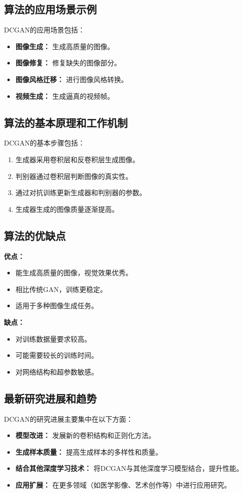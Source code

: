 \subsection*{算法的应用场景示例}
DCGAN的应用场景包括：
\begin{itemize}
    \item \textbf{图像生成：} 生成高质量的图像。
    \item \textbf{图像修复：} 修复缺失的图像部分。
    \item \textbf{图像风格迁移：} 进行图像风格转换。
    \item \textbf{视频生成：} 生成逼真的视频帧。
\end{itemize}

\subsection*{算法的基本原理和工作机制}
DCGAN的基本步骤包括：
\begin{enumerate}
    \item 生成器采用卷积层和反卷积层生成图像。
    \item 判别器通过卷积层判断图像的真实性。
    \item 通过对抗训练更新生成器和判别器的参数。
    \item 生成器生成的图像质量逐渐提高。
\end{enumerate}

\subsection*{算法的优缺点}
\textbf{优点：}
\begin{itemize}
    \item 能生成高质量的图像，视觉效果优秀。
    \item 相比传统GAN，训练更稳定。
    \item 适用于多种图像生成任务。
\end{itemize}

\textbf{缺点：}
\begin{itemize}
    \item 对训练数据量要求较高。
    \item 可能需要较长的训练时间。
    \item 对网络结构和超参数敏感。
\end{itemize}

\subsection*{最新研究进展和趋势}
DCGAN的研究进展主要集中在以下方面：
\begin{itemize}
    \item \textbf{模型改进：} 发展新的卷积结构和正则化方法。
    \item \textbf{生成样本质量：} 提高生成样本的多样性和质量。
    \item \textbf{结合其他深度学习技术：} 将DCGAN与其他深度学习模型结合，提升性能。
    \item \textbf{应用扩展：} 在更多领域（如医学影像、艺术创作等）中进行应用研究。
\end{itemize}
